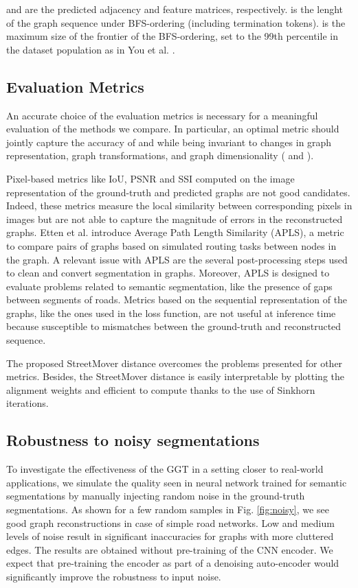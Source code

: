 \documentclass{article}
\begin{document}
  and  are the predicted adjacency and feature matrices, respectively.  is the lenght of the graph sequence under BFS-ordering (including termination tokens).  is the maximum size of the frontier of the BFS-ordering, set to the 99th percentile in the dataset population as in You et al. \citep{you2018graphrnn}. 

\subsection{Evaluation Metrics}
\label{app:eval}
An accurate choice of the evaluation metrics is necessary for a meaningful evaluation of the methods we compare. In particular, an optimal metric should jointly capture the accuracy of  and  while being invariant to changes in graph representation, graph transformations, and graph dimensionality ( and ).

Pixel-based metrics like IoU, PSNR and SSI \citep{wang2004image} computed on the image representation of the ground-truth and predicted graphs are not good candidates. Indeed, these metrics measure the local similarity between corresponding pixels in images but are not able to capture the magnitude of errors in the reconstructed graphs. 
Etten et al. \citep{van2018spacenet} introduce Average Path Length Similarity (APLS), a metric to compare pairs of graphs based on simulated routing tasks between nodes in the graph. A relevant issue with APLS are the several post-processing steps used to clean and convert segmentation in graphs. Moreover, APLS is designed to evaluate problems related to semantic segmentation, like the presence of gaps between segments of roads. Metrics based on the sequential representation of the graphs, like the ones used in the loss function, are not useful at inference time because susceptible to mismatches between the ground-truth and reconstructed sequence.

The proposed StreetMover distance overcomes the problems presented for other metrics. Besides, the StreetMover distance is easily interpretable by plotting the alignment weights and efficient to compute thanks to the use of Sinkhorn iterations. 


\subsection{Robustness to noisy segmentations}

To investigate the effectiveness of the GGT in a setting closer to real-world applications, we simulate the quality seen in neural network trained for semantic segmentations by manually injecting random noise in the ground-truth segmentations. As shown for a few random samples in Fig. \ref{fig:noisy}, we see good graph reconstructions in case of simple road networks. Low and medium levels of noise result in significant inaccuracies for graphs with more cluttered edges. The results are obtained without pre-training of the CNN encoder. We expect that pre-training the encoder as part of a denoising auto-encoder would significantly improve the robustness to input noise.
\end{document}
